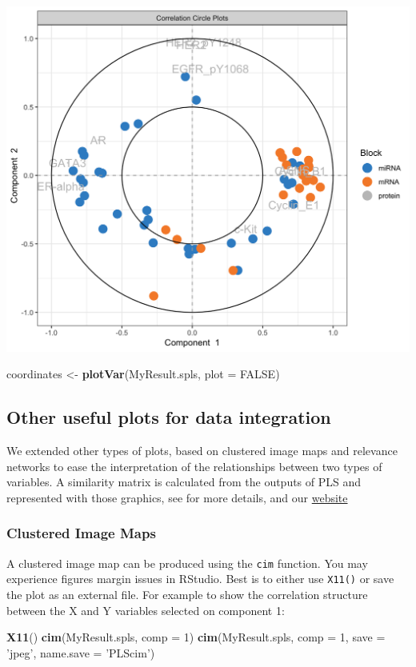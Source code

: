 \documentclass[]{book}
\newenvironment{Shaded}{\begin{snugshade}}{\end{snugshade}}
\newcommand{\KeywordTok}[1]{\textcolor[rgb]{0.13,0.29,0.53}{\textbf{#1}}}
\newcommand{\DataTypeTok}[1]{\textcolor[rgb]{0.13,0.29,0.53}{#1}}
\newcommand{\DecValTok}[1]{\textcolor[rgb]{0.00,0.00,0.81}{#1}}
\newcommand{\StringTok}[1]{\textcolor[rgb]{0.31,0.60,0.02}{#1}}
\newcommand{\OtherTok}[1]{\textcolor[rgb]{0.56,0.35,0.01}{#1}}
\newcommand{\NormalTok}[1]{#1}
\theoremstyle{definition}
\theoremstyle{definition}
\theoremstyle{definition}
\theoremstyle{remark}
\begin{document}
\begin{center}\includegraphics[width=0.5\linewidth]{Figures/unnamed-chunk-5-1} \end{center}

\begin{Shaded}
\begin{Highlighting}[]
\NormalTok{coordinates <-}\StringTok{ }\KeywordTok{plotVar}\NormalTok{(MyResult.spls, }\DataTypeTok{plot =} \OtherTok{FALSE}\NormalTok{)}
\end{Highlighting}
\end{Shaded}

\subsection{Other useful plots for data
integration}\label{other-useful-plots-for-data-integration}

We extended other types of plots, based on clustered image maps and
relevance networks to ease the interpretation of the relationships
between two types of variables. A similarity matrix is calculated from
the outputs of PLS and represented with those graphics, see
\citep{Gon12} for more details, and our
\href{http://mixomics.org/graphics/variable-plots/}{website}

\subsubsection{Clustered Image Maps}\label{clustered-image-maps}

A clustered image map can be produced using the \texttt{cim} function.
You may experience figures margin issues in RStudio. Best is to either
use \texttt{X11()} or save the plot as an external file. For example to
show the correlation structure between the X and Y variables selected on
component 1:

\begin{Shaded}
\begin{Highlighting}[]
\KeywordTok{X11}\NormalTok{()}
\KeywordTok{cim}\NormalTok{(MyResult.spls, }\DataTypeTok{comp =} \DecValTok{1}\NormalTok{)}
\KeywordTok{cim}\NormalTok{(MyResult.spls, }\DataTypeTok{comp =} \DecValTok{1}\NormalTok{, }\DataTypeTok{save =} \StringTok{'jpeg'}\NormalTok{, }\DataTypeTok{name.save =} \StringTok{'PLScim'}\NormalTok{)}
\end{Highlighting}
\end{Shaded}
\end{document}
